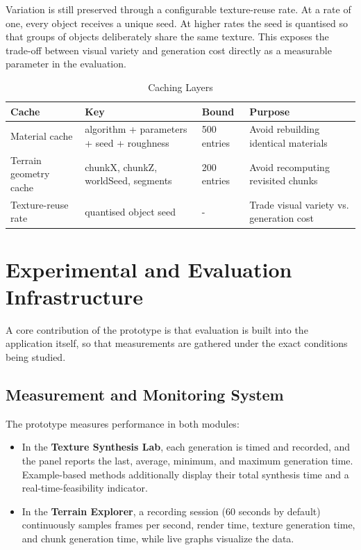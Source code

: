Variation is still preserved through a configurable texture-reuse rate. At a rate of one, every object receives a unique seed. At higher rates the seed is quantised so that groups of objects deliberately share the same texture. This exposes the trade-off between visual variety and generation cost directly as a measurable parameter in the evaluation.

\begin{table}[H]
    \centering
    \caption{Caching Layers}
    \label{tab:caching-layers}
    \begin{tabularx}{\textwidth}{|X|X|X|X|}
    \hline
    \textbf{Cache} & \textbf{Key} & \textbf{Bound} & \textbf{Purpose} \\
    \hline
    \hline
    
    Material cache & algorithm + parameters + seed + roughness & 500 entries & Avoid rebuilding identical materials \\
    \hline

    Terrain geometry cache & chunkX, chunkZ, worldSeed, segments & 200 entries & Avoid recomputing revisited chunks \\
    \hline

    Texture-reuse rate & quantised object seed & - & Trade visual variety vs. generation cost \\
    \hline
    
    \end{tabularx}
\end{table}

\section{Experimental and Evaluation Infrastructure}

A core contribution of the prototype is that evaluation is built into the application itself, so that measurements are gathered under the exact conditions being studied.

\subsection{Measurement and Monitoring System}
\label{sec:measurement-system}

The prototype measures performance in both modules:

\begin{itemize}[noitemsep, topsep=0pt]
    \item In the \textbf{Texture Synthesis Lab}, each generation is timed and recorded, and the panel reports the last, average, minimum, and maximum generation time. Example-based methods additionally display their total synthesis time and a real-time-feasibility indicator.
    \item In the \textbf{Terrain Explorer}, a recording session (60 seconds by default) continuously samples frames per second, render time, texture generation time, and chunk generation time, while live graphs visualize the data.
\end{itemize}

